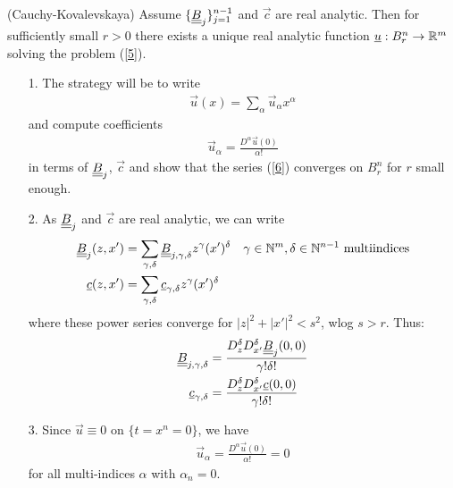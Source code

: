 \documentclass[12pt,a4paper]{report}
\newenvironment{proof}
{\begin{changemargin}{1cm}{0.5cm} 
	}%
	{\end{changemargin}
}
\begin{document}
\thm (Cauchy-Kovalevskaya) Assume $\{\underline{\underline{B}}_j \}_{j=1}^{n-1}$ and $\vec{c}$ are real analytic. Then for sufficiently small $r>0$ there exists a unique real analytic function $\underline{u} : B_r^n \rightarrow \mathbb{R}^m$ solving the problem (\ref{5}).
\begin{proof}
\pf \begin{itemize}
\item[1.] The strategy will be to write
\begin{align}
\vec{u}(x)  = \sum_{\alpha} \vec{u}_{\alpha}x^{\alpha} \label{6}
\end{align}
and compute coefficients
\begin{align*}
\vec{u}_{\alpha} = \frac{D^{\alpha } \vec{u}(0)}{\alpha !}
\end{align*}
in terms of $\underline{\underline{B}}_j$, $\vec{c}$ and show that the series (\ref{6}) converges on $B_r^n$ for $r$ small enough.

\item[2.] As $\underline{\underline{B}}_j$ and $\vec{c}$ are real analytic, we can write
\begin{align*}
\underline{\underline{B}}_j(z,x') &= \sum_{\gamma, \delta} \underline{\underline{B}}_{j,\gamma,\delta}z^{\gamma}(x')^{ \delta} \quad \gamma\in \mathbb{N}^m,\delta \in \mathbb{N}^{n-1} \text{ multiindices} \\
\underline{c}(z,x') & = \sum_{\gamma, \delta} \underline{c}_{\gamma, \delta} z^{\gamma}(x')^{ \delta}
\end{align*}
where these power series converge for $ |z|^2 + |x'|^2 <s^2$, wlog $s>r$.
Thus:
\begin{align}
\underline{\underline{B}}_{j, \gamma, \delta} &= \frac{D_z^{\delta} D_{x'}^{\delta} \underline{\underline{B}}_{j}(0,0)}{\gamma ! \delta !} \label{7}\\
\underline{c}_{\gamma, \delta} &= \frac{D_z^{\delta} D_{x'}^{\delta} \underline{c}(0,0)}{\gamma ! \delta !} \nonumber
\end{align}

\item[3.] Since $\vec{u} \equiv 0$ on $\{ t=x^n =0 \}$, we have
\begin{align*}
\vec{u}_{\alpha} = \frac{D^{\alpha}\vec{u}(0)}{\alpha !} = 0
\end{align*}
for all multi-indices $\alpha$ with $\alpha_n=0$.


\end{itemize}
\end{proof}
\end{document}
